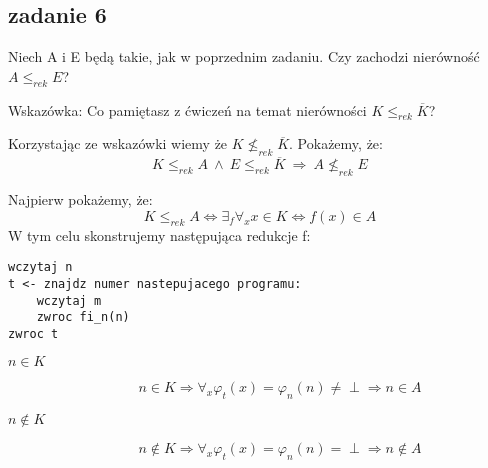 \documentclass[svgnames]{report}
\begin{document}
\subsection{zadanie 6}
\begin{framed}
Niech A i E będą takie, jak w poprzednim zadaniu. Czy zachodzi nierówność $A \leqslant_{rek} E$?

Wskazówka: Co pamiętasz z ćwiczeń na temat nierówności  $K \leqslant_{rek} \overline{K}$?
\end{framed}

Korzystając ze wskazówki wiemy że $K \not\leqslant_{rek} \overline{K}$.
Pokażemy, że:
\begin{equation}
K \leqslant_{rek} A \ \wedge \ E \leqslant_{rek} \overline{K} \ \Rightarrow \ A \not \leqslant_{rek} E 
\end{equation}

Najpierw pokażemy, że:
\begin{equation}
K \leqslant_{rek} A \Leftrightarrow \exists_f \forall_{x} x \in K \Leftrightarrow f(x) \in A
\end{equation}
W tym celu skonstrujemy następująca redukcje f:
\begin{lstlisting}
wczytaj n 
t <- znajdz numer nastepujacego programu:
	wczytaj m
	zwroc fi_n(n)
zwroc t
\end{lstlisting}
\begin{description}
	\item[$n \in K$] 
		\begin{equation*}
			n \in K \Rightarrow \forall_x \varphi_t(x) = \varphi_n(n) \not= \perp \Rightarrow n \in A
		\end{equation*}
	\item[$n \not\in K$]
		\begin{equation*}
			n \not\in K \Rightarrow \forall_x \varphi_t(x) = \varphi_n(n) = \perp \Rightarrow n \not\in A
		\end{equation*}
\end{description}
\end{document}
